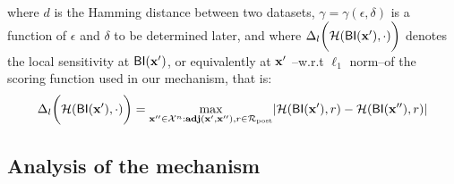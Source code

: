 \documentclass[sigconf, anonymous]{acmart}
\begin{document}
 where $d$ is the Hamming distance between two datasets,  $\gamma = \gamma(\epsilon, \delta)$ is a function
 of $\epsilon$ and $\delta$ to be determined later, and where $\Delta_{l}\bigg (\mathcal{H}(\mathsf{BI}(\textbf{x}'),\cdot)\bigg )$
 denotes the local sensitivity at $\mathsf{BI}(\textbf{x}')$, or equivalently at $\textbf{x}'$ --w.r.t $\ell_1$ norm--of the scoring function used in our mechanism, that is:
 \begin{equation*}
 \Delta_{l}\bigg (\mathcal{H}(\mathsf{BI}(\textbf{x}'),\cdot)\bigg )=\max_{\textbf{x}'' \in \mathcal{X}^n:\textbf{adj}(\textbf{x}',\textbf{x}''), r\in \mathcal{R}_{\textup{post}}}\lvert \mathcal{H}(\mathsf{BI}(\textbf{x}'), r) - \mathcal{H}(\mathsf{BI}(\textbf{x}''), r)\rvert
\end{equation*}


\subsection{Analysis of the mechanism}

\end{document}
